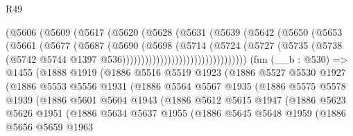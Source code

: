 \begin{lexlean}{R49}
\begin{coremodule}
                            (@5606
                              (@5609
                                (@5617
                                  (@5620
                                    (@5628
                                      (@5631
                                        (@5639
                                          (@5642
                                            (@5650
                                              (@5653
                                                (@5661
                                                  (@5677
                                                    (@5687
                                                      (@5690
                                                        (@5698
                                                          (@5714
                                                            (@5724
                                                              (@5727
                                                                (@5735
                                                                  (@5738
                                                                    (@5742
                                                                      @5744
                                                                      @1397
                                                                      @536)))))))))))))))))))))))))))))))))
    (fun (__b : @530) =>
    @1455
      (@1888
        @1919
        (@1886
          @5516
          @5519
          @1923
          (@1886
            @5527
            @5530
            @1927
            (@1886
              @5553
              @5556
              @1931
              (@1886
                @5564
                @5567
                @1935
                (@1886
                  @5575
                  @5578
                  @1939
                  (@1886
                    @5601
                    @5604
                    @1943
                    (@1886
                      @5612
                      @5615
                      @1947
                      (@1886
                        @5623
                        @5626
                        @1951
                        (@1886
                          @5634
                          @5637
                          @1955
                          (@1886
                            @5645
                            @5648
                            @1959
                            (@1886
                              @5656
                              @5659
                              @1963

\end{coremodule}
\end{lexlean}
